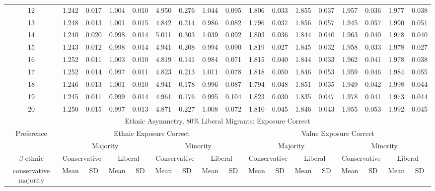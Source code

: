 \documentclass{article}
\begin{document}
\begin{table}[H]
{\begin{tabular}{|c|c|c|c|c|c|c|c|c|c|c|c|c|c|c|c|c|}
    12 & 1.242 & 0.017 & 1.004 & 0.010 & 4.950 & 0.276 & 1.044 & 0.095 & 1.806 & 0.033 & 1.855 & 0.037 & 1.957 & 0.036 & 1.977 & 0.038 \\ 
    13 & 1.248 & 0.013 & 1.001 & 0.015 & 4.842 & 0.214 & 0.986 & 0.082 & 1.796 & 0.037 & 1.856 & 0.057 & 1.945 & 0.057 & 1.990 & 0.051 \\ 
    14 & 1.240 & 0.020 & 0.998 & 0.014 & 5.011 & 0.303 & 1.039 & 0.092 & 1.803 & 0.036 & 1.844 & 0.040 & 1.963 & 0.040 & 1.978 & 0.040 \\ 
    15 & 1.243 & 0.012 & 0.998 & 0.014 & 4.941 & 0.208 & 0.994 & 0.090 & 1.819 & 0.027 & 1.845 & 0.032 & 1.958 & 0.033 & 1.978 & 0.027 \\ 
    16 & 1.252 & 0.011 & 1.003 & 0.010 & 4.819 & 0.141 & 0.984 & 0.071 & 1.815 & 0.040 & 1.844 & 0.033 & 1.962 & 0.041 & 1.978 & 0.038 \\ 
    17 & 1.252 & 0.014 & 0.997 & 0.011 & 4.823 & 0.213 & 1.011 & 0.078 & 1.818 & 0.050 & 1.846 & 0.053 & 1.959 & 0.046 & 1.984 & 0.055 \\ 
    18 & 1.246 & 0.013 & 1.001 & 0.010 & 4.941 & 0.178 & 0.996 & 0.087 & 1.794 & 0.048 & 1.851 & 0.035 & 1.949 & 0.042 & 1.998 & 0.044 \\ 
    19 & 1.245 & 0.011 & 0.999 & 0.014 & 4.961 & 0.176 & 0.995 & 0.104 & 1.823 & 0.030 & 1.835 & 0.047 & 1.978 & 0.041 & 1.973 & 0.044 \\ 
    20 & 1.250 & 0.015 & 0.997 & 0.013 & 4.871 & 0.227 & 1.008 & 0.072 & 1.810 & 0.045 & 1.846 & 0.043 & 1.955 & 0.053 & 1.992 & 0.045 \\ 
   \hline
     \multicolumn{17}{|c|}{Ethnic Asymmetry, $80 \%$ Liberal Migrants: Exposure Correct}  \\\hline
 Preference &  \multicolumn{8}{|c|}{Ethnic Exposure Correct} & \multicolumn{8}{|c|}{Value Exposure Correct}   \\\hline
 & \multicolumn{4}{|c|}{Majority} & \multicolumn{4}{|c|}{Minority}  & \multicolumn{4}{|c|}{Majority} & \multicolumn{4}{|c|}{Minority}  \\
 $\beta$ ethnic & \multicolumn{2}{|c|}{Conservative} & \multicolumn{2}{|c|}{Liberal} 
& \multicolumn{2}{|c|}{Conservative} & \multicolumn{2}{|c|}{Liberal} & \multicolumn{2}{|c|}{Conservative} & \multicolumn{2}{|c|}{Liberal} 
& \multicolumn{2}{|c|}{Conservative} & \multicolumn{2}{|c|}{Liberal}\\
 conservative majority & Mean & SD & Mean & SD & Mean & SD & Mean & SD & Mean & SD & Mean & SD & Mean & SD & Mean & SD\\
 \hline

\end{tabular}}
\end{table}
\end{document}
